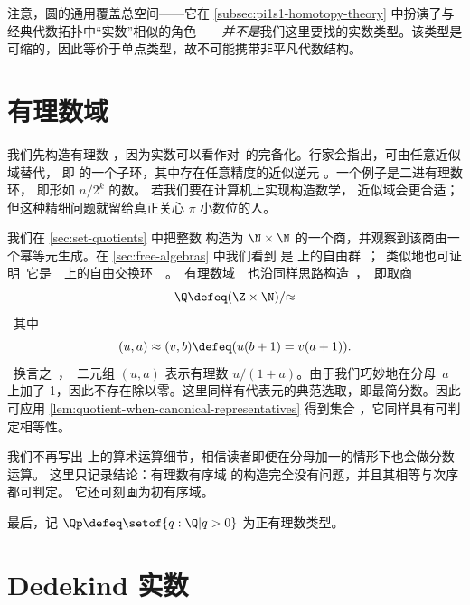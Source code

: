 注意，圆的通用覆盖总空间——它在 \cref{subsec:pi1s1-homotopy-theory} 中扮演了与经典代数拓扑中“实数”相似的角色——\emph{并不是}我们这里要找的实数类型。该类型是可缩的，因此等价于单点类型，故不可能携带非平凡代数结构。



\section{有理数域}
\label{sec:field-rati-numb}

%
%
我们先构造有理数 \Q，因为实数可以看作对~\Q 的完备化。行家会指出，\Q 可由任意近似域替代，
%
即 \Q 的一个子环，其中存在任意精度的近似逆元%
。一个例子是二进有理数环，
%
即形如 $n/2^k$ 的数。
若我们要在计算机上实现构造数学，
近似域会更合适；但这种精细问题就留给真正关心 $\pi$ 小数位的人。

我们在 \cref{sec:set-quotients} 中把整数 \Z 构造为 $\N\times
\N$ 的一个商，并观察到该商由一个幂等元生成。在
\cref{sec:free-algebras} 中我们看到 \Z 是 \unit 上的自由群；类似地也可证明
它是 \emptyt 上的自由交换环。有理数域 \Q
也沿同样思路构造，即取商
%
\[ \Q \defeq (\Z \times \N)/{\approx} \]
%
其中
\[ (u,a) \approx (v,b) \defeq (u (b + 1) = v (a + 1)). \]
%
换言之，二元组 $(u, a)$ 表示有理数 $u / (1 + a)$。由于我们巧妙地在分母~$a$ 上加了 1，因此不存在除以零。这里同样有代表元的典范选取，即最简分数。因此可应用 \cref{lem:quotient-when-canonical-representatives} 得到集合 \Q，它同样具有可判定相等性。
%

我们不再写出 \Q 上的算术运算细节，相信读者即便在分母加一的情形下也会做分数运算。
这里只记录结论：有理数有序域 \Q 的构造完全没有问题，并且其相等与次序都可判定。
它还可刻画为初有序域。
%

%
%
最后，记 $\Qp \defeq \setof{ q : \Q | q > 0 }$ 为正有理数类型。

\section{Dedekind 实数}
\label{sec:dedekind-reals}

